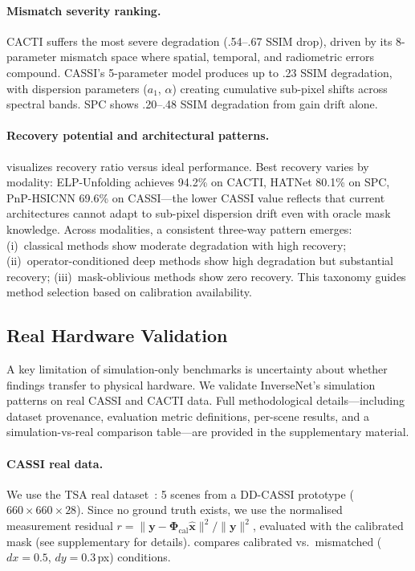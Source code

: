 \documentclass[runningheads]{llncs}
\begin{document}
\paragraph{Mismatch severity ranking.}
CACTI suffers the most severe degradation (.54--.67 SSIM drop), driven by its 8-parameter mismatch space where spatial, temporal, and radiometric errors compound.
CASSI's 5-parameter model produces up to .23 SSIM degradation, with dispersion parameters ($a_1$, $\alpha$) creating cumulative sub-pixel shifts across spectral bands.
SPC shows .20--.48 SSIM degradation from gain drift alone.

\paragraph{Recovery potential and architectural patterns.}
 visualizes recovery ratio versus ideal performance.
Best recovery varies by modality: ELP-Unfolding achieves 94.2\% on CACTI, HATNet 80.1\% on SPC, PnP-HSICNN 69.6\% on CASSI---the lower CASSI value reflects that current architectures cannot adapt to sub-pixel dispersion drift even with oracle mask knowledge.
Across modalities, a consistent three-way pattern emerges: (i)~classical methods show moderate degradation with high recovery; (ii)~operator-conditioned deep methods show high degradation but substantial recovery; (iii)~mask-oblivious methods show zero recovery.
This taxonomy guides method selection based on calibration availability.

\subsection{Real Hardware Validation}
\label{sec:real_data}

A key limitation of simulation-only benchmarks is uncertainty about whether findings transfer to physical hardware.
We validate InverseNet's simulation patterns on real CASSI and CACTI data.
Full methodological details---including dataset provenance, evaluation metric definitions, per-scene results, and a simulation-vs-real comparison table---are provided in the supplementary material.

\paragraph{CASSI real data.}
We use the TSA real dataset~\cite{choi2017kaist}: 5 scenes from a DD-CASSI prototype ($660 \times 660 \times 28$).
Since no ground truth exists, we use the normalised measurement residual $r = \|\mathbf{y} - \mathbf{\Phi}_{\text{cal}}\hat{\mathbf{x}}\|^2 / \|\mathbf{y}\|^2$, evaluated with the calibrated mask (see supplementary for details).
 compares calibrated vs.\ mismatched ($dx{=}0.5$, $dy{=}0.3$\,px) conditions.
\end{document}

